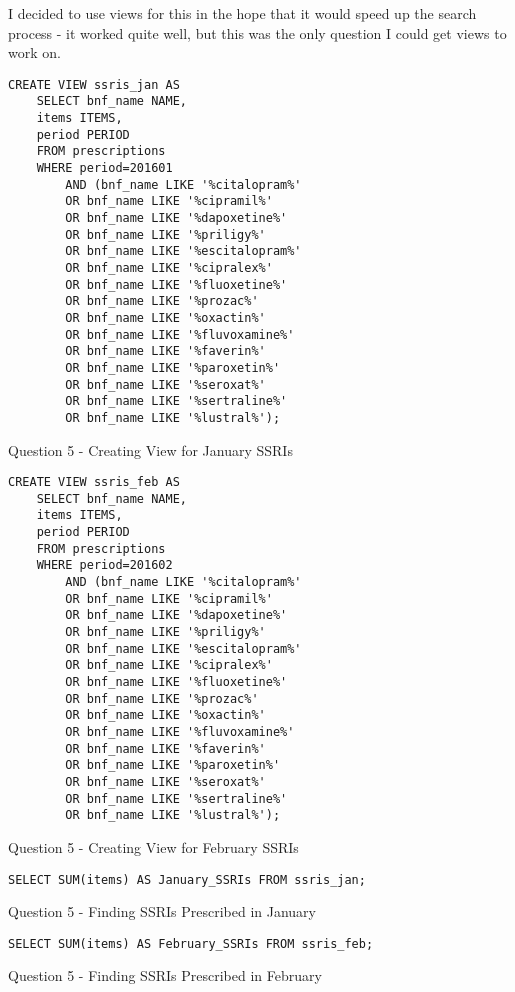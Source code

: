 \documentclass{report}
\begin{document}
I decided to use views for this in the hope that it would speed up the search process - it worked quite well, but this was the only question I could get views to work on.

\begin{listing}[H]
\begin{verbatim}
CREATE VIEW ssris_jan AS 
	SELECT bnf_name NAME, 
	items ITEMS, 
	period PERIOD 
	FROM prescriptions 
	WHERE period=201601 
		AND (bnf_name LIKE '%citalopram%' 
		OR bnf_name LIKE '%cipramil%' 
		OR bnf_name LIKE '%dapoxetine%' 
		OR bnf_name LIKE '%priligy%' 
		OR bnf_name LIKE '%escitalopram%' 
		OR bnf_name LIKE '%cipralex%' 
		OR bnf_name LIKE '%fluoxetine%' 
		OR bnf_name LIKE '%prozac%' 
		OR bnf_name LIKE '%oxactin%' 
		OR bnf_name LIKE '%fluvoxamine%' 
		OR bnf_name LIKE '%faverin%' 
		OR bnf_name LIKE '%paroxetin%' 
		OR bnf_name LIKE '%seroxat%' 
		OR bnf_name LIKE '%sertraline%' 
		OR bnf_name LIKE '%lustral%');
\end{verbatim}
\caption{Question 5 - Creating View for January SSRIs}
\label{lst: Q5-1}
\end{listing}

\begin{listing}[H]
\begin{verbatim}
CREATE VIEW ssris_feb AS 
	SELECT bnf_name NAME, 
	items ITEMS, 
	period PERIOD 
	FROM prescriptions 
	WHERE period=201602 
		AND (bnf_name LIKE '%citalopram%' 
		OR bnf_name LIKE '%cipramil%' 
		OR bnf_name LIKE '%dapoxetine%' 
		OR bnf_name LIKE '%priligy%' 
		OR bnf_name LIKE '%escitalopram%' 
		OR bnf_name LIKE '%cipralex%' 
		OR bnf_name LIKE '%fluoxetine%' 
		OR bnf_name LIKE '%prozac%' 
		OR bnf_name LIKE '%oxactin%' 
		OR bnf_name LIKE '%fluvoxamine%' 
		OR bnf_name LIKE '%faverin%' 
		OR bnf_name LIKE '%paroxetin%' 
		OR bnf_name LIKE '%seroxat%' 
		OR bnf_name LIKE '%sertraline%' 
		OR bnf_name LIKE '%lustral%');
\end{verbatim}
\caption{Question 5 - Creating View for February SSRIs}
\label{lst: Q5-2}
\end{listing}

\begin{listing}[H]
\begin{verbatim}
SELECT SUM(items) AS January_SSRIs FROM ssris_jan;
\end{verbatim}
\caption{Question 5 - Finding SSRIs Prescribed in January}
\label{lst: Q5-3}
\end{listing}

\begin{listing}[H]
\begin{verbatim}
SELECT SUM(items) AS February_SSRIs FROM ssris_feb;
\end{verbatim}
\caption{Question 5 - Finding SSRIs Prescribed in February}
\label{lst: Q5-4}
\end{listing}
\end{document}
